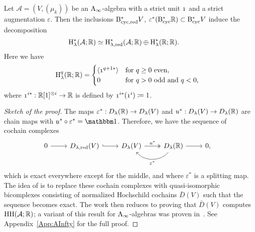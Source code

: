 \documentclass[\MainFolder/Text.tex]{subfiles}
\begin{document}
\begin{Proposition}\label{Prop:Reduced}
Let $\mathcal{A}= (V,(\mu_k))$ be an $\mathrm{A}_\infty$-algebra with a strict unit $\NOne$ and a strict augmentation $\varepsilon$. Then the inclusions $\mathrm{B}_{\mathrm{cyc},\mathrm{red}}^* V$, $\varepsilon^*(\mathrm{B}_{\mathrm{cyc}}^* \mathbb{R}) \subset \mathrm{B}_{\mathrm{cyc}}^* V$ induce the decomposition
\begin{align*}
\mathrm{H}_\lambda^*(\mathcal{A};\mathbb{R}) &\simeq \mathrm{H}_{\lambda, \mathrm{red}}^*(\mathcal{A};\mathbb{R}) \oplus \mathrm{H}_\lambda^*(\mathbb{R};\mathbb{R}).
\end{align*}
Here we have
\begin{equation*}
 \H_\lambda^{q}(\R; \R) = \begin{cases} \langle \NOne^{q+1*} \rangle & \text{for }q\ge 0 \text{ even}, \\
0 & \text{for }q> 0 \text{ odd and }q<0, \\
\end{cases}
\end{equation*}
where $\NOne^{i*}: \R[1]^{\otimes i} \rightarrow \R$ is defined by $\NOne^{i*}(\NOne^{i}) \coloneqq 1$.
\end{Proposition}
\begin{proof}[Sketch of the proof]
The maps $\varepsilon^*: D_\lambda(\mathbb{R}) \rightarrow D_\lambda(V)$ and $u^*: D_\lambda(V) \rightarrow D_\lambda(\mathbb{R})$ are chain maps with $u^*\circ \varepsilon^* = \Id$. Therefore, we have the sequence of cochain complexes
\begin{equation}\label{Eq:UnitAugSS}
\begin{tikzcd}
 0 \arrow{r} &D_{\lambda,\RedMRM}(V) \arrow[hook]{r} & D_\lambda(V) \arrow[two heads]{r}{u^*} & \arrow[bend left=50]{l}{\varepsilon^*} D_\lambda(\R) \arrow{r} & 0, 
\end{tikzcd}
\end{equation}
which is exact everywhere except for the middle, and where $\varepsilon^*$ is a splitting map. The idea of \cite{LodayCyclic} is to replace these cochain complexes with quasi-isomorphic bicomplexes consisting of normalized Hochschild cochains $\bar{D}(V)$ such that the sequence becomes exact. The work then reduces to proving that $\bar{D}(V)$ computes $\mathrm{H}\mathrm{H}(\mathcal{A};\mathbb{R})$; a variant of this result for $\mathrm{A}_\infty$-algebras was proven in~\cite{Lazarev2003}.
See Appendix~\ref{App:AInfty} for the full proof.
\end{proof}
\end{document}
